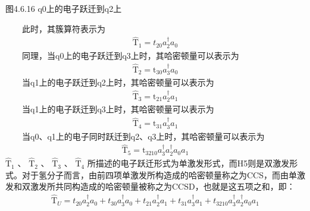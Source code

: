 \documentclass[a4paper,11pt,english]{sphinxmanual}
\begin{document}
\begin{center}图4.6.16 q0上的电子跃迁到q2上
\end{center}
\sphinxAtStartPar
  此时，其簇算符表示为
\begin{equation*}
\begin{split}\mathrm{\hat{T}}_{1}=t_{20} a_{2}^{\dagger} a_{0}\end{split}
\end{equation*}
\sphinxAtStartPar
  同理，当q0上的电子跃迁到q3上时，其哈密顿量可以表示为
\begin{equation*}
\begin{split}\mathrm{\hat{T}}_{2}=\mathrm{t}_{30} a_{3}^{\dagger} a_{0}\end{split}
\end{equation*}
\sphinxAtStartPar
  当q1上的电子跃迁到q2上时，其哈密顿量可以表示为
\begin{equation*}
\begin{split}\mathrm{\hat{T}}_{3}=\mathrm{t}_{21} a_{2}^{\dagger} a_{1}\end{split}
\end{equation*}
\sphinxAtStartPar
  当q1上的电子跃迁到q3上时，其哈密顿量可以表示为
\begin{equation*}
\begin{split}\mathrm{\hat{T}}_{4}=\mathrm{t}_{31} a_{3}^{\dagger} a_{1}\end{split}
\end{equation*}
\sphinxAtStartPar
  当q0、q1上的电子同时跃迁到q2、q3上时，其哈密顿量可以表示为
\begin{equation*}
\begin{split}\mathrm{\hat{T}}_{5}=\mathrm{t}_{3210}a_{3}^{\dagger} a_{2}^{\dagger} a_{0} a_{1}\end{split}
\end{equation*}
\sphinxAtStartPar
\(\mathrm{\hat{T}}_{1}\) 、 \(\mathrm{\hat{T}}_{2}\) 、 \(\mathrm{\hat{T}}_{3}\) 、 \(\mathrm{\hat{T}}_{4}\) 所描述的电子跃迁形式为单激发形式，而H5则是双激发形式。对于氢分子而言，由前四项单激发所构造成的哈密顿量称之为CCS，而由单激发和双激发所共同构造成的哈密顿量被称之为CCSD，也就是这五项之和，即：
\begin{equation*}
\begin{split}\mathrm{\hat{T}}_{U}=t_{20} a_{2}^{\dagger} a_{0}+t_{30} a_{3}^{\dagger} a_{0}+t_{21} a_{2}^{\dagger} a_{1}+t_{31} a_{3}^{\dagger} a_{1}+t_{3210} a_{3}^{\dagger} a_{2}^{\dagger} a_{0} a_{1}\end{split}
\end{equation*}
\end{document}
